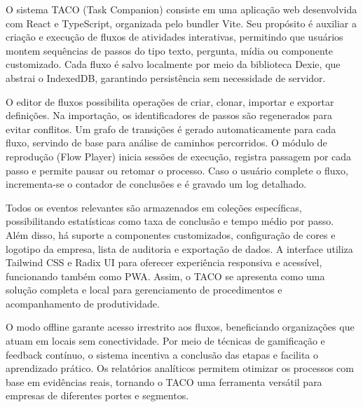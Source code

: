 O sistema TACO (Task Companion) \cite{taco_repo} consiste em uma aplicação web desenvolvida com React e TypeScript, organizada pelo bundler Vite. Seu propósito é auxiliar a criação e execução de fluxos de atividades interativas, permitindo que usuários montem sequências de passos do tipo texto, pergunta, mídia ou componente customizado. Cada fluxo é salvo localmente por meio da biblioteca Dexie, que abstrai o IndexedDB, garantindo persistência sem necessidade de servidor.

O editor de fluxos possibilita operações de criar, clonar, importar e exportar definições. Na importação, os identificadores de passos são regenerados para evitar conflitos. Um grafo de transições é gerado automaticamente para cada fluxo, servindo de base para análise de caminhos percorridos. O módulo de reprodução (Flow Player) inicia sessões de execução, registra passagem por cada passo e permite pausar ou retomar o processo. Caso o usuário complete o fluxo, incrementa-se o contador de conclusões e é gravado um log detalhado.

Todos os eventos relevantes são armazenados em coleções específicas, possibilitando estatísticas como taxa de conclusão e tempo médio por passo. Além disso, há suporte a componentes customizados, configuração de cores e logotipo da empresa, lista de auditoria e exportação de dados. A interface utiliza Tailwind CSS e Radix UI para oferecer experiência responsiva e acessível, funcionando também como PWA. Assim, o TACO se apresenta como uma solução completa e local para gerenciamento de procedimentos e acompanhamento de produtividade.

O modo offline garante acesso irrestrito aos fluxos, beneficiando organizações que atuam em locais sem conectividade. Por meio de técnicas de gamificação e feedback contínuo, o sistema incentiva a conclusão das etapas e facilita o aprendizado prático. Os relatórios analíticos permitem otimizar os processos com base em evidências reais, tornando o TACO uma ferramenta versátil para empresas de diferentes portes e segmentos.
